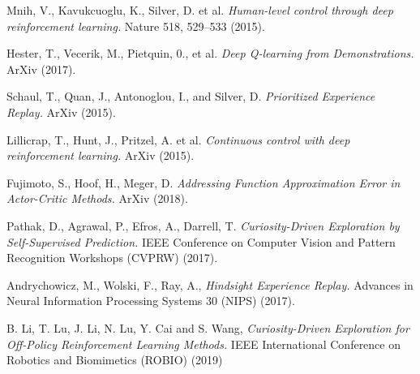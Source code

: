 \documentclass[12pt,a4paper]{article}
\begin{document}
\begin{thebibliography}{99}


  Mnih, V., Kavukcuoglu, K., Silver, D. et al. 
  {\em Human-level control through deep reinforcement learning.} 
   Nature 518, 529–533 (2015).

  Hester, T., Vecerik, M., Pietquin, 0., et al. 
  {\em Deep Q-learning from Demonstrations.}
  ArXiv (2017).

  Schaul, T., Quan, J., Antonoglou, I., and Silver, D.
  {\em Prioritized Experience Replay.}
  ArXiv (2015).

  Lillicrap, T., Hunt, J., Pritzel, A. et al.
  {\em Continuous control with deep reinforcement learning.}
  ArXiv (2015).

  Fujimoto, S., Hoof, H., Meger, D.
  {\em Addressing Function Approximation Error in Actor-Critic Methods.}
  ArXiv (2018).

   Pathak, D., Agrawal, P., Efros, A., Darrell, T.
  {\em Curiosity-Driven Exploration by Self-Supervised Prediction.}
  IEEE Conference on Computer Vision and Pattern Recognition Workshops (CVPRW) (2017).

   Andrychowicz, M., Wolski, F., Ray, A.,
  {\em Hindsight Experience Replay.}
  Advances in Neural Information Processing Systems 30 (NIPS) (2017).

  B. Li, T. Lu, J. Li, N. Lu, Y. Cai and S. Wang, 
  {\em Curiosity-Driven Exploration for Off-Policy Reinforcement Learning Methods.}
  IEEE International Conference on Robotics and Biomimetics (ROBIO) (2019)
\end{thebibliography}
	
\end{document}
